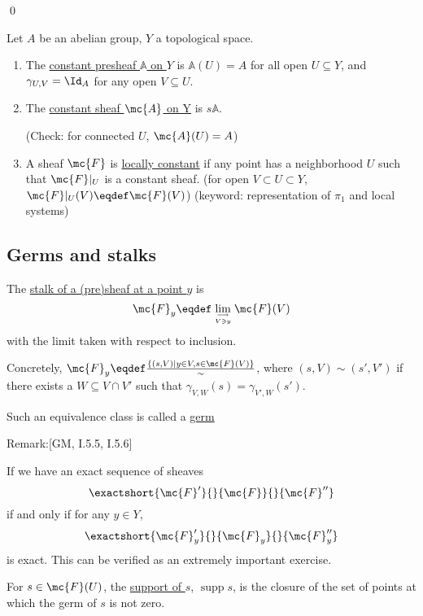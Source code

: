 \documentclass[x11names,reqno,14pt]{extarticle}
\newcommand{\A}{\mathbb{A}}
\DeclareMathOperator{\supp}{supp}
\begin{document}
\qed


Let $A$ be an abelian group, $Y$ a topological space. 

\begin{enumerate}[label=(\alph*)]

\item The \underline{constant presheaf $\A$ on $Y$} is $\A(U) = A$ for all open $U \subseteq Y$, and $\gamma_{U,V} = \Id_A$ for any open $V \subseteq U$. 

\item The \underline{constant sheaf $\mc{A}$ on Y} is $s\A$.

(Check: for connected $U$, $\mc{A}(U) = A$)

\item A sheaf $\mc{F}$ is \underline{locally constant} if any point has a neighborhood $U$ such that $\mc{F}|_U$ is a constant sheaf. (for open $V \subset U \subset Y$, $\mc{F}|_U(V) \eqdef \mc{F}(V)$) (keyword: representation of $\pi_1$ and local systems)

\end{enumerate}

\subsection*{Germs and stalks}


The \underline{stalk of a (pre)sheaf at a point $y$} is
\[
\mc{F}_y \eqdef \lim_{\longrightarrow\atop{V\ni y}}\mc{F}(V)
\]
with the limit taken with respect to inclusion.

Concretely, $\mc{F}_y \eqdef \frac{\{(s, V) \mid y \in V, s \in \mc{F}(V)\}}{\sim}$, where $(s, V) \sim (s', V')$ if there exists a $W \subseteq V \cap V'$ such that $\gamma_{V,W}(s) = \gamma_{V',W}(s')$. 

Such an equivalence class is called a \underline{germ}

Remark:[GM, I.5.5, I.5.6]

If we have an exact sequence of sheaves
\[
\exactshort{\mc{F}'}{}{\mc{F}}{}{\mc{F}''}
\]
if and only if for any $y \in Y$, 
\[
\exactshort{\mc{F}_y'}{}{\mc{F}_y}{}{\mc{F}_y''}
\]
is exact. This can be verified as an extremely important exercise.



For $s \in \mc{F}(U)$, the \underline{support of $s$}, $\supp s$, is the closure of the set of points at which the germ of $s$ is not zero. 
\end{document}
